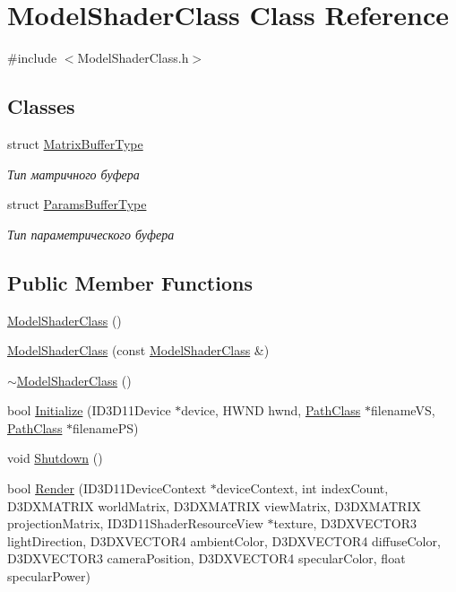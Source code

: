 \hypertarget{class_model_shader_class}{}\section{Model\+Shader\+Class Class Reference}
\label{class_model_shader_class}


{\ttfamily \#include $<$Model\+Shader\+Class.\+h$>$}

\subsection*{Classes}
\begin{DoxyCompactItemize}
\item 
struct \hyperlink{struct_model_shader_class_1_1_matrix_buffer_type}{Matrix\+Buffer\+Type}
\begin{DoxyCompactList}\small\item\em Тип матричного буфера \end{DoxyCompactList}\item 
struct \hyperlink{struct_model_shader_class_1_1_params_buffer_type}{Params\+Buffer\+Type}
\begin{DoxyCompactList}\small\item\em Тип параметрического буфера \end{DoxyCompactList}\end{DoxyCompactItemize}
\subsection*{Public Member Functions}
\begin{DoxyCompactItemize}
\item 
\hyperlink{class_model_shader_class_acf6dec65a8a8678a47e51b538ba48bb5}{Model\+Shader\+Class} ()
\item 
\hyperlink{class_model_shader_class_ab8cd7cdc75f235d76b1333a71d34999f}{Model\+Shader\+Class} (const \hyperlink{class_model_shader_class}{Model\+Shader\+Class} \&)
\item 
\hyperlink{class_model_shader_class_a0fc46a27cc0efb0c55cf6e44d7104d7d}{$\sim$\+Model\+Shader\+Class} ()
\item 
bool \hyperlink{class_model_shader_class_a0389c116d147ff39db92f0abb0660a16}{Initialize} (I\+D3\+D11\+Device $\ast$device, H\+W\+ND hwnd, \hyperlink{class_path_class}{Path\+Class} $\ast$filename\+VS, \hyperlink{class_path_class}{Path\+Class} $\ast$filename\+PS)
\item 
void \hyperlink{class_model_shader_class_a36bbd82766c9b415c0ea14309ba82876}{Shutdown} ()
\item 
bool \hyperlink{class_model_shader_class_a54685860c5bd9f843f11230f225fe42b}{Render} (I\+D3\+D11\+Device\+Context $\ast$device\+Context, int index\+Count, D3\+D\+X\+M\+A\+T\+R\+IX world\+Matrix, D3\+D\+X\+M\+A\+T\+R\+IX view\+Matrix, D3\+D\+X\+M\+A\+T\+R\+IX projection\+Matrix, I\+D3\+D11\+Shader\+Resource\+View $\ast$texture, D3\+D\+X\+V\+E\+C\+T\+O\+R3 light\+Direction, D3\+D\+X\+V\+E\+C\+T\+O\+R4 ambient\+Color, D3\+D\+X\+V\+E\+C\+T\+O\+R4 diffuse\+Color, D3\+D\+X\+V\+E\+C\+T\+O\+R3 camera\+Position, D3\+D\+X\+V\+E\+C\+T\+O\+R4 specular\+Color, float specular\+Power)
\end{DoxyCompactItemize}
